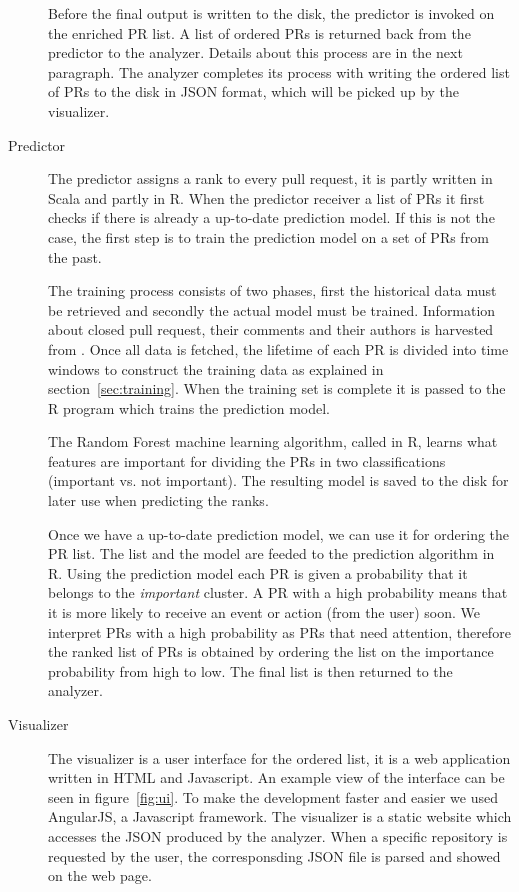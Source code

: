 \begin{description}
Before the final output is written to the disk, the predictor is invoked on the enriched PR list.
A list of ordered PRs is returned back from the predictor to the analyzer.
Details about this process are in the next paragraph.
The analyzer completes its process with writing the ordered list of PRs to the disk in JSON format, which will be picked up by the visualizer.

\item[Predictor]
The predictor assigns a rank to every pull request, it is partly written in Scala and partly in R.
When the predictor receiver a list of PRs it first checks if there is already a up-to-date prediction model.
If this is not the case, the first step is to train the prediction model on a set of PRs from the past.

The training process consists of two phases, first the historical data must be retrieved and secondly the actual model must be trained.
Information about closed pull request, their comments and their authors is harvested from \ghtorrent.
Once all data is fetched, the lifetime of each PR is divided into time windows to construct the training data as explained in section~\ref{sec:training}.
When the training set is complete it is passed to the R program which trains the prediction model.

The Random Forest machine learning algorithm, called in R, learns what features are important for dividing the PRs in two classifications (important vs. not important).
The resulting model is saved to the disk for later use when predicting the ranks.

Once we have a up-to-date prediction model, we can use it for ordering the PR list.
The list and the model are feeded to the prediction algorithm in R.
Using the prediction model each PR is given a probability that it belongs to the \emph{important} cluster.
A PR with a high probability means that it is more likely to receive an event or action (from the user) soon.
We interpret PRs with a high probability as PRs that need attention, therefore the ranked list of PRs is obtained by ordering the list on the importance probability from high to low.
The final list is then returned to the analyzer.

\item[Visualizer]
The visualizer is a user interface for the ordered list, it is a web application written in HTML and Javascript.
An example view of the interface can be seen in figure~\ref{fig:ui}.
To make the development faster and easier we used AngularJS, a Javascript framework.
The visualizer is a static website which accesses the JSON produced by the analyzer.
When a specific repository is requested by the user, the corresponsding JSON file is parsed and showed on the web page.


\end{description}

